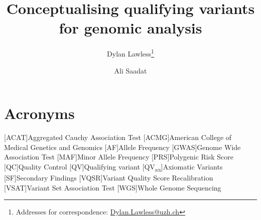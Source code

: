 
\usepackage[printonlyused,withpage,nohyperlinks]{acronym}
% 


\newcommand{\boxlabel}[1]{%
  \refstepcounter{myboxcounter}%
  \label{#1}%
}


\title{Conceptualising qualifying variants for genomic analysis}

\author[1]{Dylan Lawless\thanks{Addresses for correspondence: \href{mailto:Dylan.Lawless@uzh.ch}{Dylan.Lawless@uzh.ch}}}
\author[2]{Ali Saadat}


\maketitle
\justify

\section*{Acronyms}
\renewenvironment{description} %
{\list{}{\labelwidth0pt\itemindent-\leftmargin
    \parsep-1em\itemsep0pt\let\makelabel\descriptionlabel}}
               {\endlist}
\begin{acronym} 
 [ACAT]{Aggregated Cauchy Association Test }
 [ACMG]{American College of Medical Genetics and Genomics}
 [AF]{Allele Frequency}
 [GWAS]{Genome Wide Association Test}
 [MAF]{Minor Allele Frequency}
 [PRS]{Polygenic Risk Score} 
  [QC]{Quality Control}
 [QV]{Qualifying variant}
 [QV\textsubscript{ax}]{Axiomatic Variants}
  [SF]{Secondary Findings}
 [VQSR]{Variant Quality Score Recalibration}
 [VSAT]{Variant Set Association Test}
 [WGS]{Whole Genome Sequencing}
\end{acronym}
  
